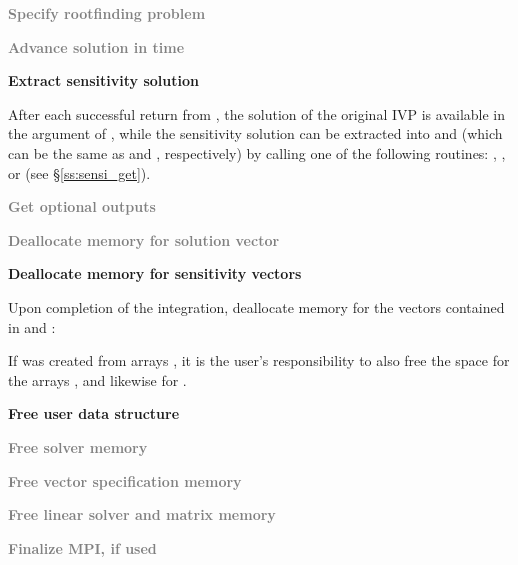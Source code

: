 \begin{Steps}
\item
  \textcolor{gray}{\bf Specify rootfinding problem}

\item
  \textcolor{gray}{\bf Advance solution in time}

\item
  {\bf Extract sensitivity solution}

  After each successful return from , the solution of the
  original IVP is available in the  argument of ,
  while the sensitivity solution can be extracted into  and 
  (which can be the same as  and , respectively) by calling 
  one of the following routines: , , 
   or  (see \S\ref{ss:sensi_get}).

\item
 \textcolor{gray}{\bf Get optional outputs}

\item
  \textcolor{gray}{\bf Deallocate memory for solution vector}

\item 
  {\bf Deallocate memory for sensitivity vectors}

  Upon completion of the integration, deallocate memory for the vectors contained
  in  and :


  If  was created from  arrays , it is the
  user's responsibility to also free the space for the arrays ,
  and likewise for .

\item
  {\bf Free user data structure}

\item
  \textcolor{gray}{\bf Free solver memory}
  
\item
  \textcolor{gray}{\bf Free vector specification memory}

\item 
  \textcolor{gray}{\bf Free linear solver and matrix memory}

\item 
  \textcolor{gray}{\bf Finalize MPI, if used}
  
\end{Steps}


